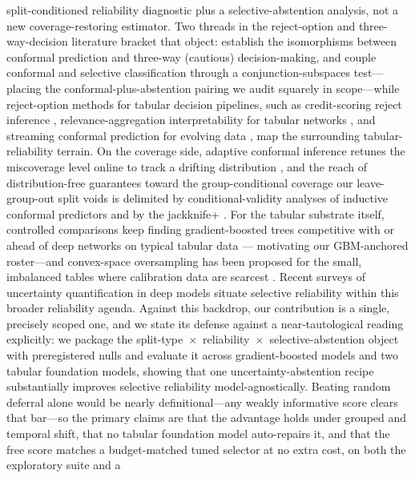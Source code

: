 \documentclass[pdflatex,sn-mathphys-num]{sn-jnl}
\begin{document}
split-conditioned reliability diagnostic plus a selective-abstention analysis, not a new
coverage-restoring estimator. Two threads in the reject-option and three-way-decision literature
bracket that object: \citet{campagner2021threeway} establish the isomorphisms between conformal
prediction and three-way (cautious) decision-making, and \citet{he2025conjunction} couple conformal
and selective classification through a conjunction-subspaces test---placing the
conformal-plus-abstention pairing we audit squarely in scope---while reject-option methods for
tabular decision pipelines, such as credit-scoring reject inference \citep{shen2022reject},
relevance-aggregation interpretability for tabular networks \citep{grisci2021relevance}, and
streaming conformal prediction for evolving data \citep{tanha2022cpssds}, map the surrounding
tabular-reliability terrain. On the coverage side, adaptive conformal inference retunes the
miscoverage level online to track a drifting distribution \citep{gibbs2021adaptive}, and the reach
of distribution-free guarantees toward the group-conditional coverage our leave-group-out split
voids is delimited by conditional-validity analyses of inductive conformal predictors
\citep{vovk2013conditional} and by the jackknife+ \citep{barber2021jackknife}. For the tabular
substrate itself, controlled comparisons keep finding gradient-boosted trees competitive with or
ahead of deep networks on typical tabular data \citep{grinsztajn2022trees,gorishniy2021revisiting}---
motivating our GBM-anchored roster---and convex-space oversampling has been proposed for the small,
imbalanced tables where calibration data are scarcest \citep{schultz2024convgen}. Recent surveys of
uncertainty quantification in deep models \citep{abdar2021review,gawlikowski2023survey} situate
selective reliability within this broader reliability agenda. Against this
backdrop, our contribution is a single, precisely scoped one, and we state its defense against a
near-tautological reading explicitly: we package the
split-type~$\times$~reliability~$\times$~selective-abstention object with preregistered nulls and evaluate it
across gradient-boosted models and two tabular foundation models, showing that one uncertainty-abstention
recipe substantially improves selective reliability model-agnostically. Beating random deferral alone would be
nearly definitional---any weakly informative score clears that bar---so the primary claims are that the
advantage holds under grouped and temporal shift, that no tabular foundation model auto-repairs it, and that
the free score matches a budget-matched tuned selector at no extra cost, on both the exploratory suite and a
\end{document}
